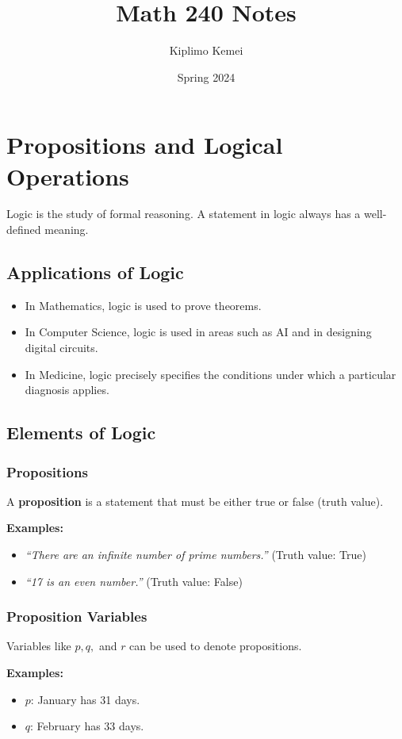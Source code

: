 \documentclass{article}
\title{Math 240 Notes}
\author{Kiplimo Kemei}
\date{Spring 2024}
\begin{document}
\maketitle

\section{Propositions and Logical Operations}
Logic is the study of formal reasoning. A statement in logic always has a well-defined meaning.

\subsection{Applications of Logic}
\begin{itemize}
    \item In Mathematics, logic is used to prove theorems.
    \item In Computer Science, logic is used in areas such as AI and in designing digital circuits.
    \item In Medicine, logic precisely specifies the conditions under which a particular diagnosis applies.
\end{itemize}

\subsection{Elements of Logic}

\subsubsection{Propositions}
A \textbf{proposition} is a statement that must be either true or false (truth value).

\textbf{Examples:}
\begin{itemize}
    \item \textit{``There are an infinite number of prime numbers.''} \quad (Truth value: True)
    \item \textit{``17 is an even number.''} \quad (Truth value: False)
\end{itemize}

\subsubsection{Proposition Variables}
Variables like $p, q,$ and $r$ can be used to denote propositions.

\textbf{Examples:}
\begin{itemize}
    \item $p$: January has 31 days.
    \item $q$: February has 33 days.
\end{itemize}
\end{document}
